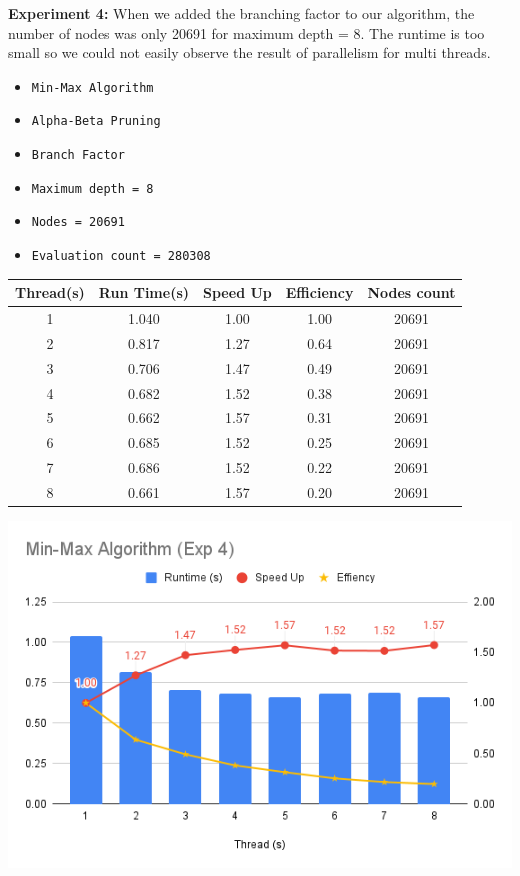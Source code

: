 \documentclass[sigconf]{acmart}
\begin{document}
{\bfseries Experiment 4:}
When we added the branching factor to our algorithm, the number of nodes was only 20691 for maximum depth = 8. The runtime is too small so we could not easily observe the result of parallelism for multi threads.

\begin{itemize}
\item {\verb|Min-Max Algorithm|}
\item {\verb|Alpha-Beta Pruning|}
\item {\verb|Branch Factor|}
\item {\verb|Maximum depth = 8|}
\item {\verb|Nodes = 20691|}
\item {\verb|Evaluation count = 280308|}
\end{itemize}
\begin{center}
  \label{tab:commands}
  \begin{tabular}{c c c c c}
    \toprule
    Thread(s)& Run Time(s) & Speed Up & Efficiency & Nodes count\\
    \midrule
    1 & 1.040 & 1.00 & 1.00 & 20691\\
    2 & 0.817 & 1.27 & 0.64 & 20691\\
    3 & 0.706 & 1.47 & 0.49 & 20691\\
    4 & 0.682 & 1.52 & 0.38 & 20691\\
    5 & 0.662 & 1.57 & 0.31 & 20691\\
    6 & 0.685 & 1.52 & 0.25 & 20691\\
    7 & 0.686 & 1.52 & 0.22 & 20691\\
    8 & 0.661 & 1.57 & 0.20 & 20691\\
    \bottomrule
  \end{tabular}
\end{center}
\includegraphics[scale=0.40]{images/exp4.png}
\end{document}

